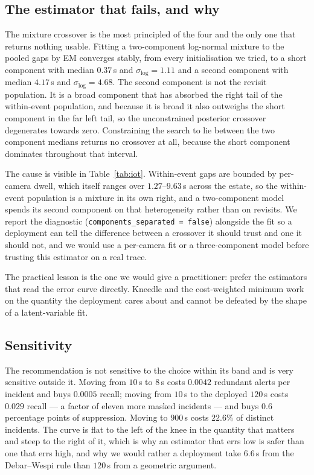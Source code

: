 \documentclass[11pt,a4paper]{article}
\begin{document}
\subsection{The estimator that fails, and why}

The mixture crossover is the most principled of the four and the only one that
returns nothing usable. Fitting a two-component log-normal mixture to the pooled
gaps by EM converges stably, from every initialisation we tried, to a short
component with median $0.37$\,s and $\sigma_{\log} = 1.11$ and a second
component with median $4.17$\,s and $\sigma_{\log} = 4.68$. The second component
is not the revisit population. It is a broad component that has absorbed the
right tail of the within-event population, and because it is broad it also
outweighs the short component in the far left tail, so the unconstrained
posterior crossover degenerates towards zero. Constraining the search to lie
between the two component medians returns no crossover at all, because the short
component dominates throughout that interval.

The cause is visible in Table~\ref{tab:iot}. Within-event gaps are bounded by
per-camera dwell, which itself ranges over $1.27$--$9.63$\,s across the estate,
so the within-event population is a mixture in its own right, and a
two-component model spends its second component on that heterogeneity rather
than on revisits. We report the diagnostic (\texttt{components\_separated =
false}) alongside the fit so a deployment can tell the difference between a
crossover it should trust and one it should not, and we would use a per-camera
fit or a three-component model before trusting this estimator on a real trace.

The practical lesson is the one we would give a practitioner: prefer the
estimators that read the error curve directly. Kneedle and the cost-weighted
minimum work on the quantity the deployment cares about and cannot be defeated
by the shape of a latent-variable fit.

\subsection{Sensitivity}

The recommendation is not sensitive to the choice within its band and is very
sensitive outside it. Moving from $10$\,s to $8$\,s costs $0.0042$ redundant
alerts per incident and buys $0.0005$ recall; moving from $10$\,s to the
deployed $120$\,s costs $0.029$ recall --- a factor of eleven more masked
incidents --- and buys $0.6$ percentage points of suppression. Moving to
$900$\,s costs $22.6\%$ of distinct incidents. The curve is flat to the left of
the knee in the quantity that matters and steep to the right of it, which is why
an estimator that errs low is safer than one that errs high, and why we would
rather a deployment take $6.6$\,s from the Debar--Wespi rule than $120$\,s from
a geometric argument.
\end{document}
